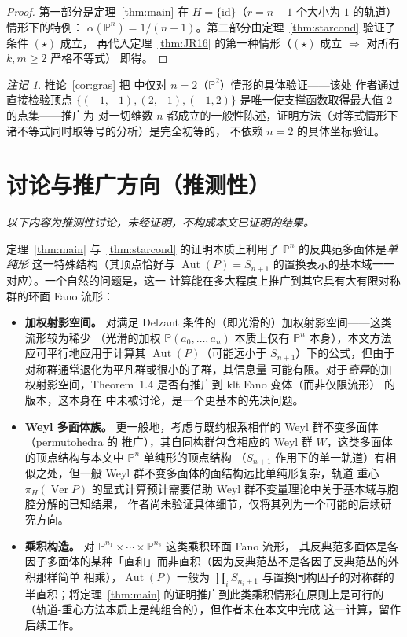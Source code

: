 \documentclass[11pt,a4paper]{article}
\theoremstyle{definition}
\theoremstyle{remark}
\newtheorem{remark}[theorem]{注记}
\DeclareMathOperator{\Aut}{Aut}
\DeclareMathOperator{\Ver}{Ver}
\newcommand{\PP}{\mathbb{P}}
\begin{document}
\begin{proof}
第一部分是定理~\ref{thm:main} 在 $H=\{\mathrm{id}\}$（$r=n+1$ 个大小为 $1$ 的轨道）情形下的特例：
$\alpha(\PP^n) = 1/(n+1)$。第二部分由定理~\ref{thm:starcond} 验证了条件 $(\star)$ 成立，
再代入定理~\ref{thm:JR16} 的第一种情形（$(\star)$ 成立 $\Rightarrow$ 对所有 $k,m\ge2$ 严格不等式）
即得。
\end{proof}

\begin{remark}
推论~\ref{cor:gras} 把 \cite[Example~8.7]{JR2025} 中仅对 $n=2$（$\PP^2$）情形的具体验证——该处
作者通过直接检验顶点 $\{(-1,-1),(2,-1),(-1,2)\}$ 是唯一使支撑函数取得最大值 $2$ 的点集——推广为
对一切维数 $n$ 都成立的一般性陈述，证明方法（对等式情形下诸不等式同时取等号的分析）是完全初等的，
不依赖 $n=2$ 的具体坐标验证。
\end{remark}

\section{讨论与推广方向（推测性）}

\emph{以下内容为推测性讨论，未经证明，不构成本文已证明的结果。}

定理~\ref{thm:main} 与~\ref{thm:starcond} 的证明本质上利用了 $\PP^n$ 的反典范多面体是\emph{单纯形}
这一特殊结构（其顶点恰好与 $\Aut(P)=S_{n+1}$ 的置换表示的基本域一一对应）。一个自然的问题是，这一
计算能在多大程度上推广到其它具有大有限对称群的环面 Fano 流形：

\begin{itemize}[leftmargin=1.8em]
  \item \textbf{加权射影空间。} 对满足 Delzant 条件的（即光滑的）加权射影空间——这类流形较为稀少
  （光滑的加权 $\PP(a_0,\dots,a_n)$ 本质上仅有 $\PP^n$ 本身），本文方法应可平行地应用于计算其
  $\Aut(P)$（可能远小于 $S_{n+1}$）下的公式，但由于对称群通常退化为平凡群或很小的子群，其信息量
  可能有限。对于\emph{奇异}的加权射影空间，Theorem~1.4 是否有推广到 klt Fano 变体（而非仅限流形）
  的版本，这本身在 \cite{JR2025} 中未被讨论，是一个更基本的先决问题。

  \item \textbf{Weyl 多面体族。} 更一般地，考虑与既约根系相伴的 Weyl 群不变多面体（permutohedra 的
  推广），其自同构群包含相应的 Weyl 群 $W$，这类多面体的顶点结构与本文中 $\PP^n$ 单纯形的顶点结构
  （$S_{n+1}$ 作用下的单一轨道）有相似之处，但一般 Weyl 群不变多面体的面结构远比单纯形复杂，轨道
  重心 $\pi_H(\Ver P)$ 的显式计算预计需要借助 Weyl 群不变量理论中关于基本域与胞腔分解的已知结果，
  作者尚未验证具体细节，仅将其列为一个可能的后续研究方向。

  \item \textbf{乘积构造。} 对 $\PP^{n_1} \times \cdots \times \PP^{n_s}$ 这类乘积环面 Fano 流形，
  其反典范多面体是各因子多面体的某种「直和」而非直积（因为反典范丛不是各因子反典范丛的外积那样简单
  相乘），$\Aut(P)$ 一般为 $\prod_i S_{n_i+1}$ 与置换同构因子的对称群的半直积；将定理~\ref{thm:main}
  的证明推广到此类乘积情形在原则上是可行的（轨道-重心方法本质上是纯组合的），但作者未在本文中完成
  这一计算，留作后续工作。
\end{itemize}
\end{document}

